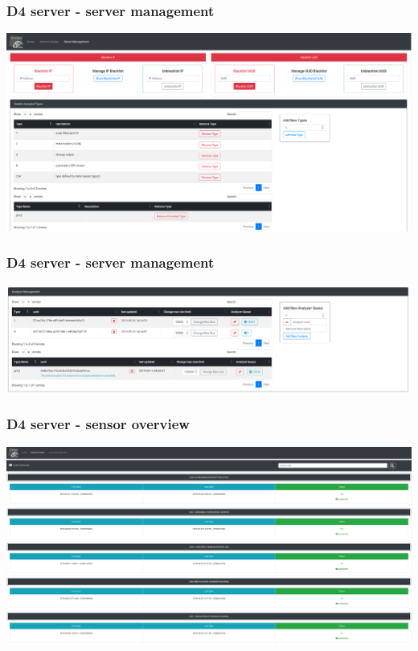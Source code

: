 \documentclass{beamer}
\begin{document}
\begin{frame}
        \frametitle{D4 server - server management}
        \includegraphics[width=\textwidth]{./d4-2.png}
\end{frame}

\begin{frame}
        \frametitle{D4 server - server management}
        \includegraphics[width=\textwidth]{./d4-3.png}
\end{frame}

\begin{frame}
        \frametitle{D4 server - sensor overview}
        \includegraphics[width=\textwidth]{./d4-1.png}
\end{frame}
\end{document}
